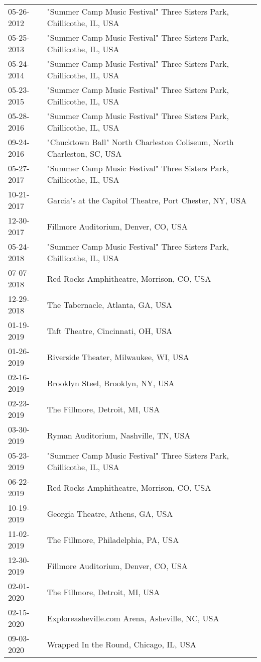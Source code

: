 \begin{supertabular}{ll}
 05-26-2012 &  "Summer Camp Music Festival" Three Sisters Park, Chillicothe, IL, USA \\
 05-25-2013 &  "Summer Camp Music Festival" Three Sisters Park, Chillicothe, IL, USA \\
 05-24-2014 &  "Summer Camp Music Festival" Three Sisters Park, Chillicothe, IL, USA \\
 05-23-2015 &  "Summer Camp Music Festival" Three Sisters Park, Chillicothe, IL, USA \\
 05-28-2016 &  "Summer Camp Music Festival" Three Sisters Park, Chillicothe, IL, USA \\
 09-24-2016 &  "Chucktown Ball" North Charleston Coliseum, North Charleston, SC, USA \\
 05-27-2017 &  "Summer Camp Music Festival" Three Sisters Park, Chillicothe, IL, USA \\
 10-21-2017 &                 Garcia’s at the Capitol Theatre, Port Chester, NY, USA \\
 12-30-2017 &                                   Fillmore Auditorium, Denver, CO, USA \\
 05-24-2018 &  "Summer Camp Music Festival" Three Sisters Park, Chillicothe, IL, USA \\
 07-07-2018 &                              Red Rocks Amphitheatre, Morrison, CO, USA \\
 12-29-2018 &                                       The Tabernacle, Atlanta, GA, USA \\
 01-19-2019 &                                      Taft Theatre, Cincinnati, OH, USA \\
 01-26-2019 &                                  Riverside Theater, Milwaukee, WI, USA \\
 02-16-2019 &                                      Brooklyn Steel, Brooklyn, NY, USA \\
 02-23-2019 &                                         The Fillmore, Detroit, MI, USA \\
 03-30-2019 &                                   Ryman Auditorium, Nashville, TN, USA \\
 05-23-2019 &  "Summer Camp Music Festival" Three Sisters Park, Chillicothe, IL, USA \\
 06-22-2019 &                              Red Rocks Amphitheatre, Morrison, CO, USA \\
 10-19-2019 &                                       Georgia Theatre, Athens, GA, USA \\
 11-02-2019 &                                    The Fillmore, Philadelphia, PA, USA \\
 12-30-2019 &                                   Fillmore Auditorium, Denver, CO, USA \\
 02-01-2020 &                                         The Fillmore, Detroit, MI, USA \\
 02-15-2020 &                         Exploreasheville.com Arena, Asheville, NC, USA \\
 09-03-2020 &                                 Wrapped In the Round, Chicago, IL, USA \\
\end{supertabular}
